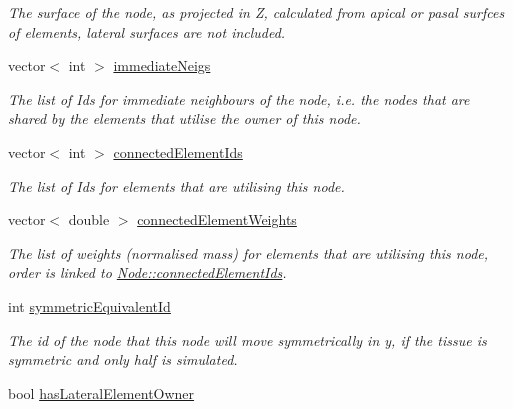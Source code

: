 \begin{DoxyCompactItemize}
\begin{DoxyCompactList}\small\item\em The surface of the node, as projected in Z, calculated from apical or pasal surfces of elements, lateral surfaces are not included. \end{DoxyCompactList}\item 
\hypertarget{classNode_ab22060fb9f61a0d93ec52e6045828782}{}vector$<$ int $>$ \hyperlink{classNode_ab22060fb9f61a0d93ec52e6045828782}{immediate\+Neigs}\label{classNode_ab22060fb9f61a0d93ec52e6045828782}

\begin{DoxyCompactList}\small\item\em The list of Id\textquotesingle{}s for immediate neighbours of the node, i.\+e. the nodes that are shared by the elements that utilise the owner of this node. \end{DoxyCompactList}\item 
\hypertarget{classNode_a18bae606efb025cc90b4c117776e0bf9}{}vector$<$ int $>$ \hyperlink{classNode_a18bae606efb025cc90b4c117776e0bf9}{connected\+Element\+Ids}\label{classNode_a18bae606efb025cc90b4c117776e0bf9}

\begin{DoxyCompactList}\small\item\em The list of Id\textquotesingle{}s for elements that are utilising this node. \end{DoxyCompactList}\item 
\hypertarget{classNode_a7ffccd2a70d08c1a42d4701f32a266c5}{}vector$<$ double $>$ \hyperlink{classNode_a7ffccd2a70d08c1a42d4701f32a266c5}{connected\+Element\+Weights}\label{classNode_a7ffccd2a70d08c1a42d4701f32a266c5}

\begin{DoxyCompactList}\small\item\em The list of weights (normalised mass) for elements that are utilising this node, order is linked to \hyperlink{classNode_a18bae606efb025cc90b4c117776e0bf9}{Node\+::connected\+Element\+Ids}. \end{DoxyCompactList}\item 
\hypertarget{classNode_ad29e0f81f8c0a5d4a3e891d3b239af7e}{}int \hyperlink{classNode_ad29e0f81f8c0a5d4a3e891d3b239af7e}{symmetric\+Equivalent\+Id}\label{classNode_ad29e0f81f8c0a5d4a3e891d3b239af7e}

\begin{DoxyCompactList}\small\item\em The id of the node that this node will move symmetrically in y, if the tissue is symmetric and only half is simulated. \end{DoxyCompactList}\item 
\hypertarget{classNode_a71d38b47678cff15e338f9c917d32696}{}bool \hyperlink{classNode_a71d38b47678cff15e338f9c917d32696}{has\+Lateral\+Element\+Owner}\label{classNode_a71d38b47678cff15e338f9c917d32696}


\end{DoxyCompactItemize}

